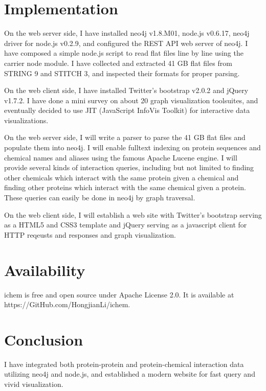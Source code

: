 \documentclass[10pt,conference,compsocconf]{../IEEEtran}
\begin{document}
\section{Implementation}

On the web server side, I have installed neo4j v1.8.M01, node.js v0.6.17, neo4j driver for node.js v0.2.9, and configured the REST API web server of neo4j. I have composed a simple node.js script to read flat files line by line using the carrier node module. I have collected and extracted 41 GB flat files from STRING 9 and STITCH 3, and inspected their formats for proper parsing.

On the web client side, I have installed Twitter's bootstrap v2.0.2 and jQuery v1.7.2. I have done a mini survey on about 20 graph visualization toolsuites, and eventually decided to use JIT (JavaScript InfoVis Toolkit) for interactive data visualizations.


On the web server side, I will write a parser to parse the 41 GB flat files and populate them into neo4j. I will enable fulltext indexing on protein sequences and chemical names and aliases using the famous Apache Lucene engine. I will provide several kinds of interaction queries, including but not limited to finding other chemicals which interact with the same protein given a chemical and finding other proteins which interact with the same chemical given a protein. These queries can easily be done in neo4j by graph traversal.

On the web client side, I will establish a web site with Twitter's bootstrap serving as a HTML5 and CSS3 template and jQuery serving as a javascript client for HTTP reqeusts and responses and graph visualization.

\section{Availability}

ichem is free and open source under Apache License 2.0. It is available at https://GitHub.com/HongjianLi/ichem.

\section{Conclusion}

I have integrated both protein-protein and protein-chemical interaction data utilizing neo4j and node.js, and established a modern website for fast query and vivid visualization.



\end{document}
